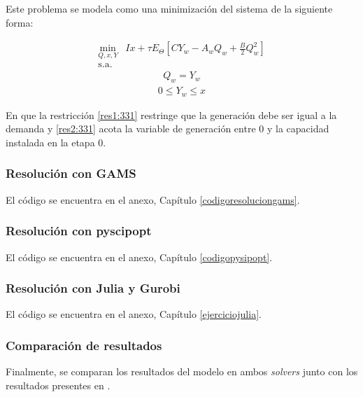 Este problema se modela como una minimización del sistema de la siguiente forma:

\begin{equation}
\begin{array}{rrclcl}
    \displaystyle \min_{Q,x,Y} & Ix+\tau E_{\Theta}[CY_w-A_wQ_w+\frac{B}{2}Q_w^2]  \\\textrm{s.a.} \label{eq:331}
\end{array}
\end{equation}
\begin{equation}
\begin{array}{cl}
    Q_w=Y_w \label{res1:331}
\end{array}
\end{equation}
\begin{equation}
\begin{array}{cl}
   0\leq Y_w \leq x\label{res2:331}
\end{array}
\end{equation}

En que la restricción \ref{res1:331} restringe que la generación debe ser igual a la demanda y \ref{res2:331} acota la variable de generación entre 0 y la capacidad instalada en la etapa 0.

\subsubsection{Resolución con GAMS}

El código se encuentra en el anexo, Capítulo \ref{codigoresoluciongams}.

\subsubsection{Resolución con pyscipopt}

El código se encuentra en el anexo, Capítulo \ref{codigopysipopt}.

\subsubsection{Resolución con Julia y Gurobi}

El código se encuentra en el anexo, Capítulo \ref{ejerciciojulia}.

\subsubsection{Comparación de resultados}

Finalmente, se comparan los resultados del modelo en ambos \textit{solvers} junto con los resultados presentes en .

